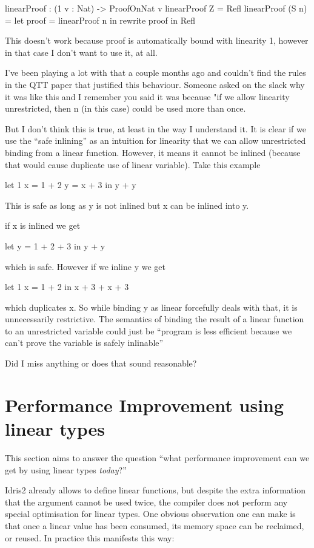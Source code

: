 \documentclass[
]{article}
\begin{document}
linearProof : (1 v : Nat) -\textgreater{} ProofOnNat v linearProof Z =
Refl linearProof (S n) = let proof = linearProof n in rewrite proof in
Refl

This doesn't work because proof is automatically bound with linearity 1,
however in that case I don't want to use it, at all.

I've been playing a lot with that a couple months ago and couldn't find
the rules in the QTT paper that justified this behaviour. Someone asked
on the slack why it was like this and I remember you said it was because
"if we allow linearity unrestricted, then n (in this case) could be used
more than once.

But I don't think this is true, at least in the way I understand it. It
is clear if we use the ``safe inlining'' as an intuition for linearity
that we can allow unrestricted binding from a linear function. However,
it means it cannot be inlined (because that would cause duplicate use of
linear variable). Take this example

let 1 x = 1 + 2 y = x + 3 in y + y

This is safe as long as y is not inlined but x can be inlined into y.

if x is inlined we get

let y = 1 + 2 + 3 in y + y

which is safe. However if we inline y we get

let 1 x = 1 + 2 in x + 3 + x + 3

which duplicates x. So while binding y as linear forcefully deals with
that, it is unnecessarily restrictive. The semantics of binding the
result of a linear function to an unrestricted variable could just be
``program is less efficient because we can't prove the variable is
safely inlinable''

Did I miss anything or does that sound reasonable?

\newpage

\hypertarget{performance-improvement-using-linear-types}{%
\section{Performance Improvement using linear
types}\label{performance-improvement-using-linear-types}}

This section aims to answer the question ``what performance improvement
can we get by using linear types \emph{today}?''

Idris2 already allows to define linear functions, but despite the extra
information that the argument cannot be used twice, the compiler does
not perform any special optimisation for linear types. One obvious
observation one can make is that once a linear value has been consumed,
its memory space can be reclaimed, or reused. In practice this manifests
this way:
\end{document}
